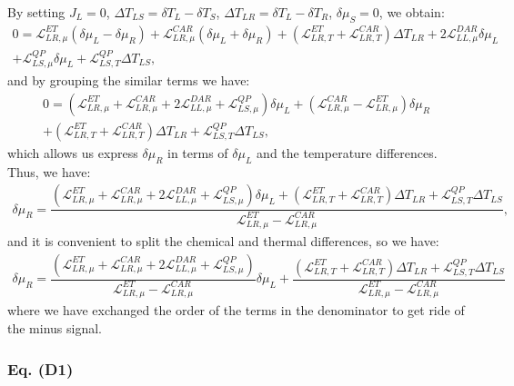By setting $J_{L}=0$, $\Delta T_{LS}=\delta T_{L}-\delta T_{S}$, $\Delta T_{LR}=\delta T_{L}-\delta T_{R}$, $\delta\mu_{S}=0$, we obtain:
\begin{multline*}
0=
\mathcal{L}_{LR,\mu}^{ET}(\delta\mu_{L}-\delta\mu_{R})+
\mathcal{L}_{LR,\mu}^{CAR}\left(\delta\mu_{L}+\delta\mu_{R}\right)
+
(\mathcal{L}_{LR,T}^{ET}+\mathcal{L}_{LR,T}^{CAR})\Delta T_{LR}
+
2\mathcal{L}_{LL,\mu}^{DAR}\delta\mu_{L}
\\+
\mathcal{L}^{QP}_{LS,\mu}\delta\mu_{L}
+
\mathcal{L}^{QP}_{LS,T}\Delta T_{LS},
\end{multline*}
and by grouping the similar terms we have:
\begin{multline*}
0=
(\mathcal{L}_{LR,\mu}^{ET}+\mathcal{L}_{LR,\mu}^{CAR}+2\mathcal{L}_{LL,\mu}^{DAR}+\mathcal{L}^{QP}_{LS,\mu})\delta\mu_{L}
+
(\mathcal{L}_{LR,\mu}^{CAR}-\mathcal{L}_{LR,\mu}^{ET})\delta\mu_{R}
\\+
(\mathcal{L}_{LR,T}^{ET}+\mathcal{L}_{LR,T}^{CAR})\Delta T_{LR}
+
\mathcal{L}^{QP}_{LS,T}\Delta T_{LS},
\end{multline*}
which allows us express $\delta\mu_{R}$ in terms of $\delta\mu_{L}$ and the temperature differences. Thus, we have:
\begin{multline*}
\delta\mu_{R}=\dfrac{
(\mathcal{L}_{LR,\mu}^{ET}+\mathcal{L}_{LR,\mu}^{CAR}+2\mathcal{L}_{LL,\mu}^{DAR}+\mathcal{L}^{QP}_{LS,\mu})\delta\mu_{L}
+
(\mathcal{L}_{LR,T}^{ET}+\mathcal{L}_{LR,T}^{CAR})\Delta T_{LR}
+
\mathcal{L}^{QP}_{LS,T}\Delta T_{LS}}{\mathcal{L}_{LR,\mu}^{ET}-\mathcal{L}_{LR,\mu}^{CAR}},
\end{multline*}
and it is convenient to split the chemical and thermal differences, so we have:
\begin{multline}\label{deltamuR:D1}
\delta\mu_{R}=\dfrac{
(\mathcal{L}_{LR,\mu}^{ET}+\mathcal{L}_{LR,\mu}^{CAR}+2\mathcal{L}_{LL,\mu}^{DAR}+\mathcal{L}^{QP}_{LS,\mu})
}{\mathcal{L}_{LR,\mu}^{ET}-\mathcal{L}_{LR,\mu}^{CAR}}\delta\mu_{L}
+
\dfrac{
(\mathcal{L}_{LR,T}^{ET}+\mathcal{L}_{LR,T}^{CAR})\Delta T_{LR}
+
\mathcal{L}^{QP}_{LS,T}\Delta T_{LS}}{\mathcal{L}_{LR,\mu}^{ET}-\mathcal{L}_{LR,\mu}^{CAR}}
\end{multline}
where we have exchanged the order of the terms in the denominator to get ride of the minus signal. 


\subsubsection{Eq. (D1)}

